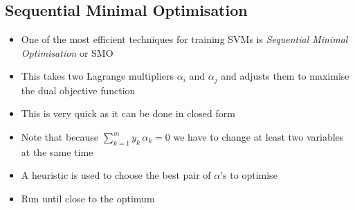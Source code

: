 
\begin{slide}
\section[-1]{Sequential Minimal Optimisation}

\begin{PauseHighLight}
  \begin{itemize}
  \item One of the most efficient techniques for training SVMs is
    \textit{Sequential Minimal Optimisation} or SMO\pause
  \item This takes two Lagrange multipliers $\alpha_i$ and $\alpha_j$
    and adjusts them to maximise the dual objective function\pause
  \item This is very quick as it can be done in closed form\pause
  \item Note that because $\sum\limits_{k=1}^m y_k\,\alpha_k = 0$ we
    have to change at least two variables at the same time\pause
  \item A heuristic is used to choose the best pair of $\alpha$'s to
    optimise\pause
  \item Run until close to the optimum\pause
  \end{itemize}
\end{PauseHighLight}

\end{slide}



